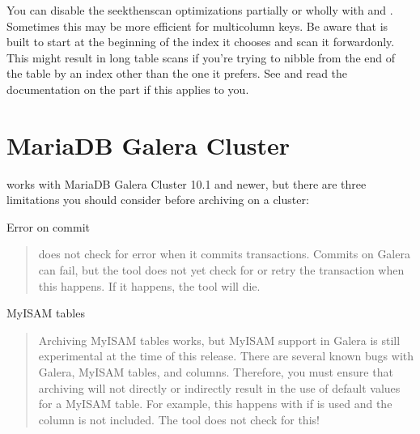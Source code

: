 \documentclass[letterpaper,10pt,english]{sphinxmanual}
\begin{document}
\sphinxAtStartPar
You can disable the seek\sphinxhyphen{}then\sphinxhyphen{}scan optimizations partially or wholly with
{\hyperref[\detokenize{mariadb-archiver:cmdoption-mariadb-archiver-no-ascend}]{}} and {\hyperref[\detokenize{mariadb-archiver:cmdoption-mariadb-archiver-ascend-first}]{}}.  Sometimes this may be more efficient
for multi\sphinxhyphen{}column keys.  Be aware that  is built to start at the
beginning of the index it chooses and scan it forward\sphinxhyphen{}only.  This might result
in long table scans if you’re trying to nibble from the end of the table by an
index other than the one it prefers.  See {\hyperref[\detokenize{mariadb-archiver:cmdoption-mariadb-archiver-source}]{}} and read the
documentation on the  part if this applies to you.


\section{MariaDB Galera Cluster}
\label{\detokenize{mariadb-archiver:mariadb-galera-cluster}}
\sphinxAtStartPar
{} works with MariaDB Galera Cluster 10.1 and newer,
but there are three limitations you should consider before archiving on
a cluster:

\sphinxAtStartPar
Error on commit
\begin{quote}

\sphinxAtStartPar
{} does not check for error when it commits transactions.
Commits on Galera can fail, but the tool does not yet check for or retry the
transaction when this happens.  If it happens, the tool will die.
\end{quote}

\sphinxAtStartPar
MyISAM tables
\begin{quote}

\sphinxAtStartPar
Archiving MyISAM tables works, but MyISAM support in Galera is still
experimental at the time of this release.  There are several known bugs with
Galera, MyISAM tables, and  columns.  Therefore, you must ensure
that archiving will not directly or indirectly result in the use of default
 values for a MyISAM table.  For example, this happens with
{\hyperref[\detokenize{mariadb-archiver:cmdoption-mariadb-archiver-dest}]{}} if {\hyperref[\detokenize{mariadb-archiver:cmdoption-mariadb-archiver-columns}]{}} is used and the  column is not
included.  The tool does not check for this!
\end{quote}
\end{document}
